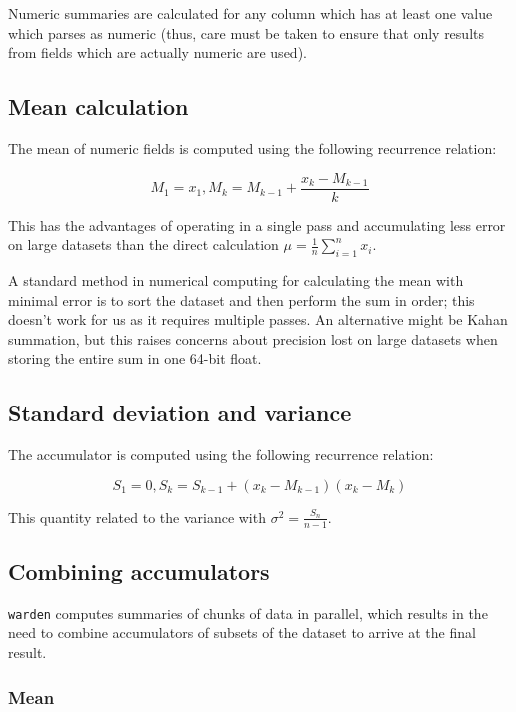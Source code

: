\documentclass[a4paper]{article}
\begin{document}
Numeric summaries are calculated for any column which has at least one
value which parses as numeric (thus, care must be taken to ensure that
only results from fields which are actually numeric are used).

\subsection{Mean calculation}\label{mean-calculation}

The mean of numeric fields is computed using the following recurrence
relation\cite[pp.~232]{Knuth1997}:

\[M_1 = x_1, M_k = M_{k-1} + \frac{x_k - M_{k-1}}{k}\]

This has the advantages of operating in a single pass and accumulating
less error on large datasets than the direct calculation
\(\mu = \frac{1}{n} \sum\limits_{i=1}^n x_i\).

A standard method in numerical computing for calculating the mean with
minimal error is to sort the dataset and then perform the sum in order;
this doesn't work for us as it requires multiple passes. An alternative
might be Kahan summation\cite{Kahan1965}, but this raises concerns about
precision lost on large datasets when storing the entire sum in one
64-bit float.

\subsection{Standard deviation and
variance}\label{standard-deviation-and-variance}

The accumulator is computed using the following recurrence relation\cite[pp.~232]{Knuth1997}:

\[S_1 = 0, S_k = S_{k-1} + (x_k - M_{k-1})(x_k - M_k)\]

This quantity related to the variance with
\(\sigma^2 = \frac{S_n}{n-1}\).

\subsection{Combining accumulators}\label{combining-accumulators}

\texttt{warden} computes summaries of chunks of data in parallel, which results
in the need to combine accumulators of subsets of the dataset to arrive
at the final result.

\subsubsection{Mean}\label{mean}
\end{document}
